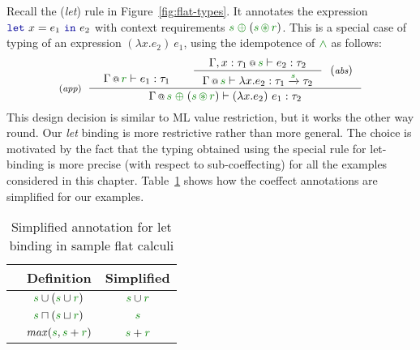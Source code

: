 Recall the (\emph{let}) rule in Figure~\ref{fig:flat-types}. It annotates the expression 
$\kvd{let}~x=e_1~\kvd{in}~e_2$ with context requirements $\cclrd{s}\;\cpar\;(\cclrd{s}\,\cseq\,\cclrd{r})$.
This is a special case of typing of an expression $(\lambda x.e_2)~e_1$, using the idempotence
of $\czip$ as follows:
%
\begin{equation*}
\tyrule{app}
  {\begin{array}{l}
   \vspace{-1.5em}
   \coctx{\Gamma}{\cclrd{r}} \vdash e_1 : \tau_1
   \end{array} &
   \tyruler{abs}
       { \coctx{\Gamma, x:\tau_1}{\cclrd{s}} \vdash e_2 : \tau_2 }
       { \coctx{\Gamma}{\cclrd{s}} \vdash \lambda x.e_2 : \tau_1 \xrightarrow{\cclrd{s}} \tau_2 } }
  { \coctx{\Gamma}{\cclrd{s}\;\cpar\;(\cclrd{s}\,\cseq\,\cclrd{r})} \vdash (\lambda x.e_2)~e_1 : \tau_2 }    
\end{equation*}
%
This design decision is similar to ML value restriction, but it works the other way round. Our
\emph{let} binding is more restrictive rather than more general. The choice is motivated by the 
fact that the typing obtained using the special rule for let-binding is more precise (with respect 
to sub-coeffecting) for all the examples considered in this chapter. Table~\ref{tab:flat-simplelet}
shows how the coeffect annotations are simplified for our examples.

\begin{table}[!h]
\begin{center}
\begin{tabular}{ | l | c | c |}
\hline
& \textbf{\footnotesize Definition\hspace{1em}} & \textbf{\footnotesize Simplified\hspace{1em}} \\ \hline
\hspace{-1em}{\footnotesize Implicit parameters} & $\cclrd{s} \cup (\cclrd{s} \cup \cclrd{r})$ & $\cclrd{s} \cup \cclrd{r}$ \\ \hline
\hspace{-1em}{\footnotesize Liveness} & $\cclrd{s} \sqcap (\cclrd{s} \sqcup \cclrd{r})$ & $\cclrd{s}$ \\ \hline
\hspace{-1em}{\footnotesize Data-flow} & $\mathit{max}(\cclrd{s}, \cclrd{s} + \cclrd{r})$ & $\cclrd{s} + \cclrd{r}$ \\ \hline
\end{tabular}
\end{center}

\vspace{-0.5em}
\caption{Simplified annotation for let binding in sample flat calculi}
\label{tab:flat-simplelet}
\end{table}

